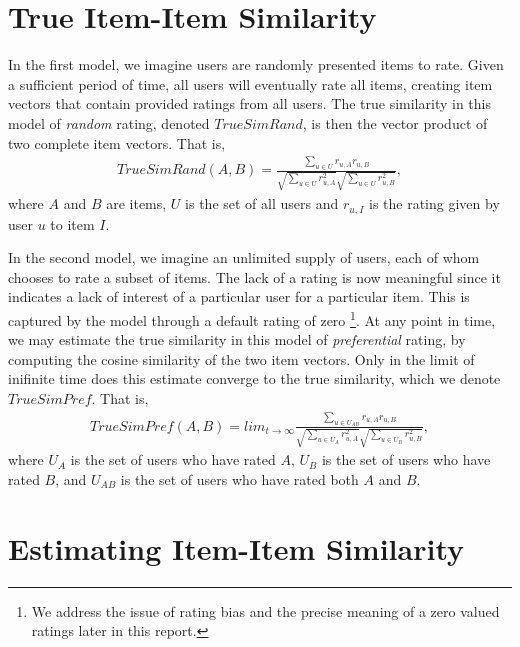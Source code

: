\documentclass[11pt]{article}
\begin{document}
\section*{True Item-Item Similarity}

In the first model, we imagine users are randomly presented items to rate. Given
a sufficient period of time, all users will eventually rate all items, creating
item vectors that contain provided ratings from all users. The true similarity
in this model of {\em random} rating, denoted $TrueSimRand$, is then the vector
product of two complete item vectors. That is,
\begin{align}
TrueSimRand(A, B) = \frac{\sum\limits_{u\in U}
r_{u,A}r_{u,B}}{\sqrt{\sum\limits_{u\in U} r_{u,A}^2}
\sqrt{\sum\limits_{u\in U} r_{u,B}^2}},
\end{align}
where $A$ and $B$ are items, $U$ is the set of all users and $r_{u,I}$ is the 
rating given by user $u$ to item $I$.

In the second model, we imagine an unlimited supply of users, each of whom
chooses to rate a subset of items. The lack of a rating is now meaningful since
it indicates a lack of interest of a particular user for a particular item. This
is captured by the model through a default rating of zero \footnote{We address
the issue of rating bias and the precise meaning of a zero valued ratings later
in this report.}. At any point in time, we may estimate the true similarity in
this model of {\em preferential} rating, by computing the cosine similarity of
the two item vectors. Only in the limit of inifinite time does this estimate
converge to the true similarity, which we denote $TrueSimPref$.  That is,
\begin{align}
TrueSimPref(A, B) = lim_{t\to\infty}\frac{\sum\limits_{u\in U_{AB}}
r_{u,A}r_{u,B}}{\sqrt{\sum\limits_{u\in U_A} r_{u,A}^2}
\sqrt{\sum\limits_{u\in U_B} r_{u,B}^2}},
\end{align}
where $U_A$ is the set of users who have rated $A$, $U_B$ is the set of users
who have rated $B$, and $U_{AB}$ is the set of users who have rated both $A$ and
$B$.

\section*{Estimating Item-Item Similarity}
\end{document}
